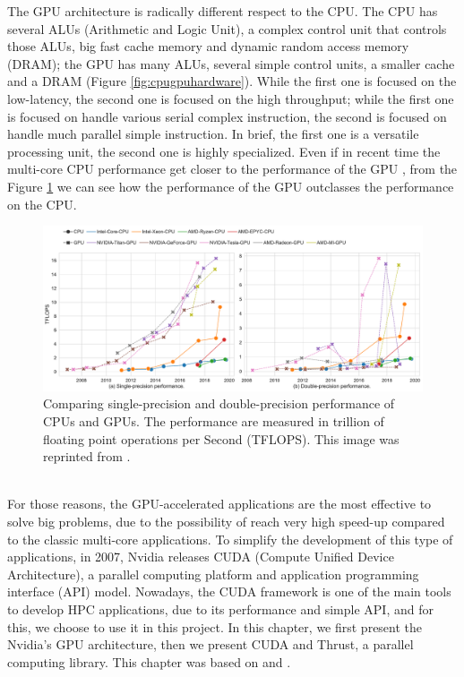 The GPU architecture is radically different respect to the CPU. The CPU has several ALUs (Arithmetic and Logic Unit), a complex control unit that controls those ALUs, big fast cache memory and dynamic random access memory (DRAM); the GPU has many ALUs, several simple control units, a smaller cache and a DRAM (Figure \ref{fig:cpugpuhardware}). While the first one is focused on the low-latency, the second one is focused on the high throughput;
while the first one is focused on handle various serial complex instruction, the second is focused on handle much parallel simple instruction.
In brief, the first one is a versatile processing unit, the second one is highly specialized.
Even if in recent time the multi-core CPU performance get closer to the performance of the GPU \cite{gpucpu}, from the Figure \ref{fig:cpugpu} we can see how the performance of the GPU outclasses the performance on the CPU.\\
\begin{figure}[h]
	\centering
	\includegraphics[width=1.\linewidth]{0-resources/cpu_gpu}
	\caption{Comparing single-precision and double-precision performance of CPUs and GPUs. The performance are measured in trillion of floating point operations per Second (TFLOPS). This image was reprinted from \cite{gpucpu}.}
	\label{fig:cpugpu}
\end{figure} 
\\	
For those reasons, the GPU-accelerated applications are the most effective to solve big problems, due to the possibility of reach very high speed-up compared to the classic multi-core applications. 
To simplify the development of this type of applications, in 2007, Nvidia releases CUDA (Compute Unified Device Architecture), a parallel computing platform and application programming interface (API) model.
Nowadays, the CUDA framework is one of the main tools to develop HPC applications, due to its performance and simple API, and for this, we choose to use it in this project.
In this chapter, we first present the Nvidia's GPU architecture, then we present CUDA and Thrust, a parallel computing library. This chapter was based on \cite{turing} and \cite{cuda_manual}.
